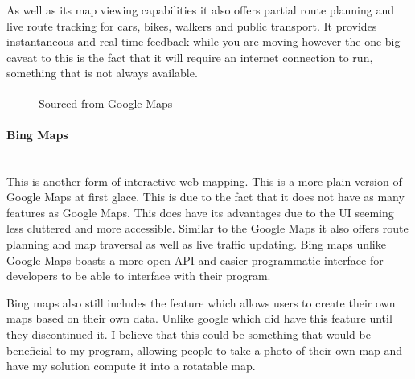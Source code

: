 \begin{FlushLeft}
            As well as its map viewing capabilities it also offers partial route planning and live route tracking for cars, bikes, walkers and public transport. It provides instantaneous and
            real time feedback while you are moving however the one big caveat to this is the fact that it will require an internet connection to run, something that is not always available. \\
            \bk
            
            \begin{figure}[H]
                \centering
                \caption*{Sourced from Google Maps\textsuperscript{\tiny\textcopyright}}
            \end{figure}

            \bk 
            
            \paragraph{Bing Maps} \mbox{} \\
            This is another form of interactive web mapping. This is a more plain version of Google Maps at first glace. This is due to the fact that it does not have as many features as Google Maps.
            This does have its advantages due to the UI seeming less cluttered and more accessible. Similar to the Google Maps it also offers route planning and map traversal as well as live traffic updating.
            Bing maps unlike Google Maps boasts a more open API and easier programmatic interface for developers to be able to interface with their program. \\
 
            \bk
 
            Bing maps also still includes the feature which allows users to create their own maps based on their own data. Unlike google which did have this feature until they discontinued it.
            I believe that this could be something that would be beneficial to my program, allowing people to take a photo of their own map and have my solution compute it into a rotatable map. \\
 

\end{FlushLeft}
